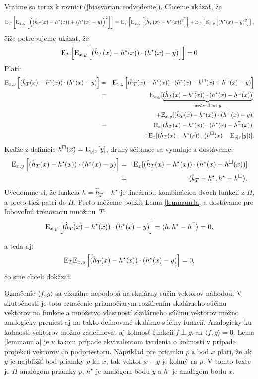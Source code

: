 \noindent
Vráťme sa teraz k rovnici (\ref{biasvarianceodvodenie}). Chceme ukázať, že
$$\mathrm{E}_T \left[ \mathrm{E}_{x,y} \left[ \left( (\hat{h}_T(x) - h^\star(x)) + (h^\star(x) - y) \right)^2 \right] \right] = \mathrm{E}_T \left[ \mathrm{E}_{x,y} \left[ (\hat{h}_T(x) - h^\star(x))^2 \right] \right] + \mathrm{E}_T \left[ \mathrm{E}_{x,y} \left[ (h^\star(x) - y)^2 \right] \right],$$
čiže potrebujeme ukázať, že
$$\mathrm{E}_T \left[ \mathrm{E}_{x, y} \left[ (\hat{h}_T(x) - h^\star(x)) \cdot (h^\star(x) - y) \right] \right] = 0$$
Platí:
\begin{eqnarray*}
\mathrm{E}_{x, y} \left[ (\hat{h}_T(x) - h^\star(x)) \cdot (h^\star(x) - y) \right] &=&
\mathrm{E}_{x,y} \left[ (\hat{h}_T(x) - h^\star(x)) \cdot (h^\star(x) - h^{\square}(x) + h^{\square}(x) - y) \right]\\
&=& \mathrm{E}_{x,y} [ \underbrace{(\hat{h}_T(x) - h^\star(x)) \cdot (h^\star(x) - h^{\square}(x))}_{\text{nezávisí od $y$}}]\\
&&+ \mathrm{E}_{x,y} [ (\hat{h}_T(x) - h^\star(x)) \cdot (h^{\square}(x) - y)]\\
&=& \mathrm{E}_x [ (\hat{h}_T(x) - h^\star(x)) \cdot (h^\star(x) - h^{\square}(x)) ]\\
&&+ \mathrm{E}_x [ (\hat{h}_T(x) - h^\star(x)) \cdot (h^{\square}(x) - \mathrm{E}_{y|x}[y]) ].
\end{eqnarray*}
Keďže z definície $h^{\square}(x) = \mathrm{E}_{y|x}[y]$, druhý sčítanec sa vynuluje a
dostávame:
\begin{eqnarray*}
  \mathrm{E}_{x, y} \left[ (\hat{h}_T(x) - h^\star(x)) \cdot (h^\star(x) - y) \right] &=&
  \mathrm{E}_x [ (\hat{h}_T(x) - h^\star(x)) \cdot (h^\star(x) - h^{\square}(x)) ]\\
  &=& \langle \hat{h}_T-h^\star, h^\star-h^\square\rangle.
\end{eqnarray*}
Uvedomme si, že funkcia $h=\hat{h}_T-h^\star$ je lineárnou kombináciou dvoch
funkcií z $H$, a preto tiež patrí do $H$. Preto môžeme použiť Lemu \ref{lemmanula} a dostávame pre ľubovoľnú trénovaciu množinu~$T$:
$$
  \mathrm{E}_{x, y} \left[ (\hat{h}_T(x) - h^\star(x)) \cdot (h^\star(x) - y) \right]
  = \langle h, h^\star-h^\square\rangle\\
  = 0,$$
  
a teda aj:
$$\mathrm{E}_T\mathrm{E}_{x, y} \left[ (\hat{h}_T(x) - h^\star(x)) \cdot (h^\star(x) - y) \right]=0,$$
čo sme chceli dokázať.

\begin{remark}
  Označenie $\langle f,g \rangle$ sa vizuálne nepodobá na skalárny
  súčin vektorov náhodou. V skutočnosti je toto označenie priamočiarym
  rozšírením skalárneho súčinu vektorov na funkcie a množstvo
  vlastností skalárneho súčinu vektorov možno analogicky preniesť aj
  na takto definované skalárne súčiny funkcií. Analogicky ku kolmosti
  vektorov možno zadefinovať aj kolmosť funkcií $f\perp g$, ak
  $\langle f,g \rangle = 0$. Lema \ref{lemmanula} je v takom prípade
  ekvivalentom tvrdenia o kolmosti v prípade projekcií vektorov do
  podpriestoru. Napríklad pre priamku $p$ a bod $x$ platí, že ak $y$
  je najbližší bod priamky $p$ ku $x$, tak vektor $x-y$ je kolmý na $p$.
  V tomto texte je $H$ analógom priamky $p$, $h^\star$ je analógom bodu $y$ a
  $h^\square$ je analógom bodu $x$.
\end{remark}

